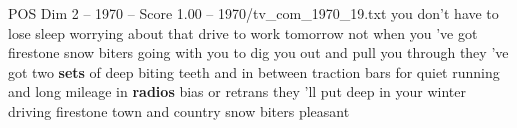 \begin{textsample}{POS Dim 2 – 1970 – Score 1.00 – 1970/tv\_com\_1970\_19.txt}  \label{ex:f2_pos_059}
you don't have to lose sleep worrying about that drive to work tomorrow not when you 've got firestone snow biters going with you to dig you out and pull you through they 've got two \textbf{sets} of deep biting teeth and in between traction bars for quiet running and long mileage in \textbf{radios} bias or retrans they 'll put deep in your winter driving firestone town and country snow biters pleasant

\end{textsample}
